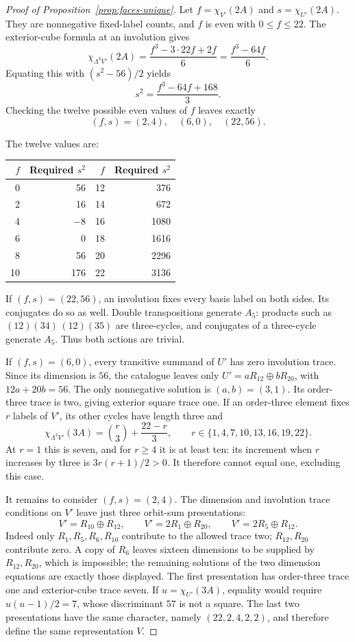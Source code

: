 \documentclass[11pt,a4paper]{article}
\begin{document}
\begin{proof}[Proof of Proposition~\ref{prop:faces-unique}]
Let $f=\chi_{V'}(2A)$ and $s=\chi_{U'}(2A)$. They are nonnegative
fixed-label counts, and $f$ is even with $0\leq f\leq22$.
The exterior-cube formula at an involution gives
\[
\chi_{\Lambda^3V'}(2A)=\frac{f^3-3\cdot22f+2f}{6}
=\frac{f^3-64f}{6}.
\]
Equating this with $(s^2-56)/2$ yields
\[
s^2=\frac{f^3-64f+168}{3}.
\]
Checking the twelve possible even values of $f$ leaves exactly
\[
(f,s)=(2,4),\quad(6,0),\quad(22,56).
\]
\begin{samepage}
The twelve values are:
\begin{center}\small
\begin{tabular}{rr|rr}
\toprule
$f$&Required $s^2$&$f$&Required $s^2$\\\midrule
0&56&12&376\\
2&16&14&672\\
4&$-8$&16&1080\\
6&0&18&1616\\
8&56&20&2296\\
10&176&22&3136\\\bottomrule
\end{tabular}
\end{center}
\end{samepage}

If $(f,s)=(22,56)$, an involution fixes every basis label on both sides.
Its conjugates do so as well. Double transpositions generate $A_5$:
products such as $(12)(34)\,(12)(35)$ are three-cycles, and conjugates of
a three-cycle generate $A_5$. Thus both actions are trivial.

If $(f,s)=(6,0)$, every transitive summand of $U'$ has zero involution
trace. Since its dimension is $56$, the catalogue leaves only
$U'=aR_{12}\oplus bR_{20}$, with $12a+20b=56$. The only nonnegative
solution is $(a,b)=(3,1)$. Its order-three trace is two, giving exterior
square trace one. If an order-three element fixes $r$ labels of $V'$, its
other cycles have length three and
\[
\chi_{\Lambda^3V'}(3A)=\binom r3+\frac{22-r}{3},
\qquad r\in\{1,4,7,10,13,16,19,22\}.
\]
At $r=1$ this is seven, and for $r\geq4$ it is at least ten: its
increment when $r$ increases by three is $3r(r+1)/2>0$.
It therefore cannot equal one, excluding this case.

It remains to consider $(f,s)=(2,4)$. The dimension and involution trace
conditions on $V'$ leave just three orbit-sum presentations:
\[
V'=R_{10}\oplus R_{12},\qquad
V'=2R_1\oplus R_{20},\qquad
V'=2R_5\oplus R_{12}.
\]
Indeed only $R_1,R_5,R_6,R_{10}$ contribute to the allowed trace two;
$R_{12},R_{20}$ contribute zero. A copy of $R_6$ leaves sixteen dimensions
to be supplied by $R_{12},R_{20}$, which is impossible; the remaining
solutions of the two dimension equations are exactly those displayed.
The first presentation has order-three trace one and exterior-cube trace
seven. If $u=\chi_{U'}(3A)$, equality would require $u(u-1)/2=7$, whose
discriminant $57$ is not a square. The last two presentations have the
same character, namely $(22,2,4,2,2)$, and therefore define the same
representation $V$.


\end{proof}
\end{document}

